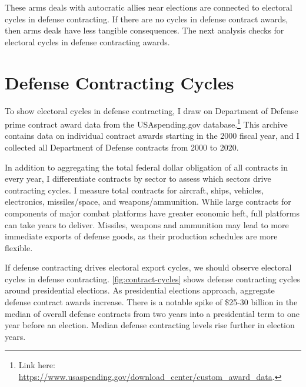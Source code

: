 \documentclass[12pt]{article}
\begin{document}
These arms deals with autocratic allies near elections are connected to electoral cycles in defense contracting. 
If there are no cycles in defense contract awards, then arms deals have less tangible consequences. 
The next analysis checks for electoral cycles in defense contracting awards. 



\section{Defense Contracting Cycles}


To show electoral cycles in defense contracting, I draw on Department of Defense prime contract award data from the USAspending.gov database.\footnote{Link here: \url{https://www.usaspending.gov/download_center/custom_award_data}.} 
This archive contains data on individual contract awards starting in the 2000 fiscal year, and I collected all Department of Defense contracts from 2000 to 2020.


In addition to aggregating the total federal dollar obligation of all contracts in every year, I differentiate contracts by sector to assess which sectors drive contracting cycles. 
I measure total contracts for aircraft, ships, vehicles, electronics, missiles/space, and weapons/ammunition. 
While large contracts for components of major combat platforms have greater economic heft, full platforms can take years to deliver. 
Missiles, weapons and ammunition may lead to more immediate exports of defense goods, as their production schedules are more flexible.


If defense contracting drives electoral export cycles, we should observe electoral cycles in defense contracting.
\autoref{fig:contract-cycles} shows defense contracting cycles around presidential elections. 
As presidential elections approach, aggregate defense contract awards increase. 
There is a notable spike of \$25-30 billion in the median of overall defense contracts from two years into a presidential term to one year before an election. 
Median defense contracting levels rise further in election years.
\end{document}
